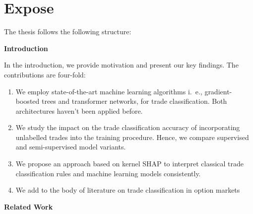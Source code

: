 \section{Expose}
\label{sec:expose}


The thesis follows the following structure:

\textbf{Introduction}

In the introduction, we provide motivation and present our key findings. The contributions are four-fold:
\begin{enumerate}
  \item We employ state-of-the-art machine learning algorithms i.~e., gradient-boosted trees and transformer networks, for trade classification. Both architectures haven't been applied before.
  \item We study the impact on the trade classification accuracy of incorporating unlabelled trades into the training procedure. Hence, we compare supervised and semi-supervised model variants.  
  \item We propose an approach based on kernel \gls{SHAP} to interpret classical trade classification rules and machine learning models consistently.
  \item We add to the body of literature on trade classification in option markets
\end{enumerate}


\textbf{Related Work}

